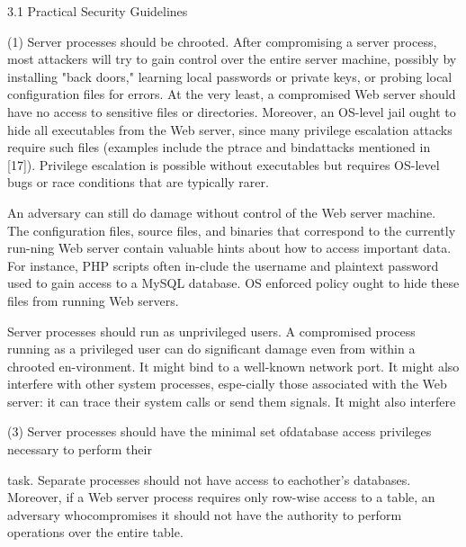 3.1 Practical Security Guidelines

(1) Server processes should be chrooted. 
After compromising a server process, most attackers will try to gain control
over the entire server machine, possibly by installing "back doors," learning
local passwords or private keys, or probing local configuration files for
errors. 
At the very least, a compromised Web server should have no access to sensitive
files or directories.
Moreover, an OS-level jail ought to hide all executables from the Web server,
since many privilege escalation attacks require such files (examples include the
ptrace and bindattacks mentioned in [17]).
Privilege escalation is possible without executables but requires OS-level bugs
or race conditions that are typically rarer.

An adversary can still do damage without control of the Web server machine. 
The configuration files, source files, and binaries that correspond to the
currently run-ning Web server contain valuable hints about how to access
important data. 
For instance, PHP scripts often in-clude the username and plaintext password
used to gain access to a MySQL database. 
OS enforced policy ought to hide these files from running Web servers.

Server processes should run as unprivileged users.
A compromised process running as a privileged user can do significant damage
even from within a chrooted en-vironment.
It might bind to a well-known network port.
It might also interfere with other system processes, espe-cially those associated with the Web server: it can trace
their system calls or send them signals.
It might also interfere

(3) Server processes should have the minimal set ofdatabase access privileges necessary to perform their

task. Separate processes should not have access to eachother's databases. Moreover, if a Web server process requires only row-wise access to a table, an adversary whocompromises it should not have the authority to perform
operations over the entire table.

